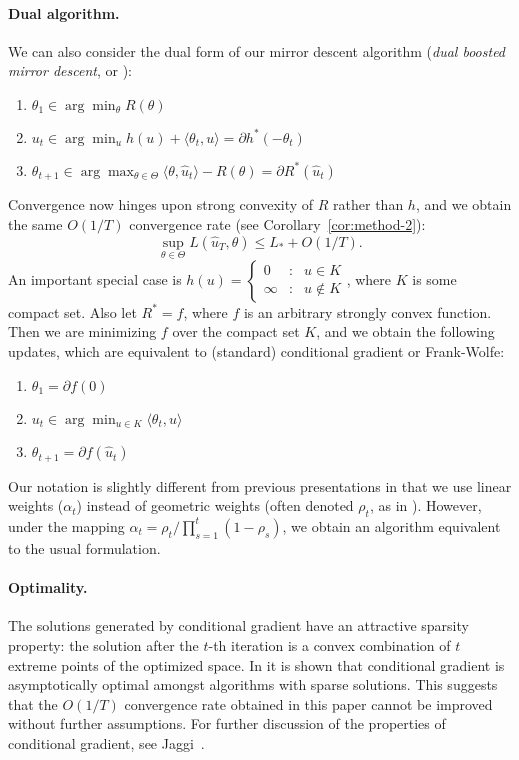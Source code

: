 \documentclass{article} %
\begin{document}
\paragraph{Dual algorithm.}
We can also consider the dual form of our mirror descent algorithm 
({\em dual boosted mirror descent}, or \dual):
\begin{enumerate}
\item $\theta_1 \in \arg\min_{\theta} R(\theta)$
\item $u_t \in \arg\min_{u} h(u) + \langle \theta_t, u \rangle = \partial h^{*}(-\theta_{t})$
\item $\theta_{t+1} \in \arg\max_{\theta \in \Theta} \langle \theta, \hat{u}_t \rangle - R(\theta) = \partial R^{*}(\hat u_{t})$
\end{enumerate}
Convergence now hinges upon strong convexity of $R$ rather than 
$h$, and we obtain the same $O(1/T)$ convergence 
rate (see Corollary~\ref{cor:method-2}):
\[ \sup_{\theta \in \Theta} L(\hat{u}_T, \theta) \leq L_{*} + O(1/T). \]
An important special case is $h(u) = \left\{ \begin{array}{ccl} 0 & : & u \in K \\ \infty & : & u \not\in K \end{array} \right.$, where $K$ is some 
compact set. Also let $R^* = f$, where $f$ is an arbitrary strongly convex 
function. Then we are minimizing $f$ over the compact set $K$, and we obtain 
the following updates, which are equivalent to (standard) conditional gradient 
or Frank-Wolfe:
\begin{enumerate}
\item $\theta_1 = \partial f(0)$
\item $u_t \in \arg\min_{u \in K} \langle \theta_t, u \rangle$
\item $\theta_{t+1} = \partial f(\hat{u}_t)$
\end{enumerate}
Our notation is slightly different from previous presentations in 
that we use linear weights ($\alpha_t$) instead of geometric weights 
(often denoted $\rho_t$, as in \cite{Bach:2012b}). However, under the 
mapping $\alpha_t = \rho_t/\prod_{s=1}^t (1-\rho_s)$, we obtain an 
algorithm equivalent to the usual formulation.

\paragraph{Optimality.}
The solutions generated by conditional gradient have 
an attractive sparsity property: the solution after the $t$-th iteration is 
a convex combination of $t$ extreme points of the optimized space. In 
\cite{Jaggi:2013} it is shown that conditional gradient is asymptotically 
optimal amongst algorithms with sparse solutions. This 
suggests that the $O(1/T)$ convergence rate obtained in this paper cannot be 
improved without further assumptions. For further discussion of the properties 
of conditional gradient, see Jaggi~\cite{Jaggi:2013}.
\end{document}
